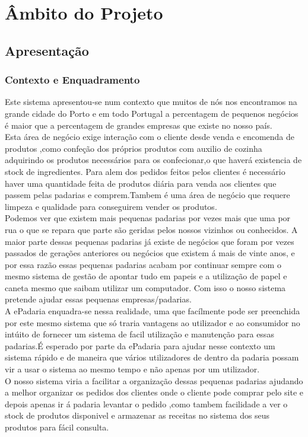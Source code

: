 \chapter{Âmbito do Projeto}
\label{ambito}
\section{Apresentação}
\subsection{Contexto e Enquadramento}
Este sistema apresentou-se num contexto que muitos de nós nos encontramos na grande cidade do Porto e em todo Portugal a percentagem de pequenos negócios é maior que a percentagem de grandes empresas que existe no nosso país.\\
Esta área de negócio  exige interação com o cliente desde venda e encomenda de produtos ,como confeção dos próprios produtos com auxilio de cozinha  adquirindo os produtos necessários para os confecionar,o que haverá existencia de stock de ingredientes. Para alem dos pedidos feitos pelos clientes é necessário haver uma quantidade feita de produtos diária para venda aos clientes que passem pelas padarias e comprem.Tambem é uma área de negócio que requere limpeza e qualidade para conseguirem vender os produtos.\\
 Podemos ver que existem mais pequenas padarias por vezes mais que uma por rua o que se repara que parte são geridas pelos nossos vizinhos ou conhecidos. A maior parte dessas pequenas padarias já existe de negócios que foram por vezes passados de gerações anteriores ou negócios que existem á mais de vinte anos, e por essa razão essas pequenas padarias acabam por continuar sempre com o mesmo sistema de gestão de apontar tudo em papeis e a utilização de papel e caneta mesmo que saibam utilizar um computador. Com isso o nosso sistema pretende ajudar essas pequenas empresas/padarias.\\
A ePadaria enquadra-se nessa realidade, uma que facílmente pode ser preenchida por este mesmo sistema que só traria vantagens ao utilizador e ao consumidor no intúito de fornecer um sistema de facil utilização e manutenção para essas padarias.É esperado por parte da ePadaria para ajudar nesse contexto um sistema rápido e de maneira que vários utilizadores de dentro da padaria possam vir a usar o sistema ao mesmo tempo e não apenas por um utilizador. \\
O nosso sistema viria a facilitar  a organização dessas pequenas padarias  ajudando a melhor organizar os pedidos dos clientes onde o cliente pode comprar pelo site e depois apenas ir á padaria levantar o pedido ,como tambem facilidade a ver o stock de produtos disponivel e armazenar as receitas no sistema dos seus produtos para fácil consulta.\\
